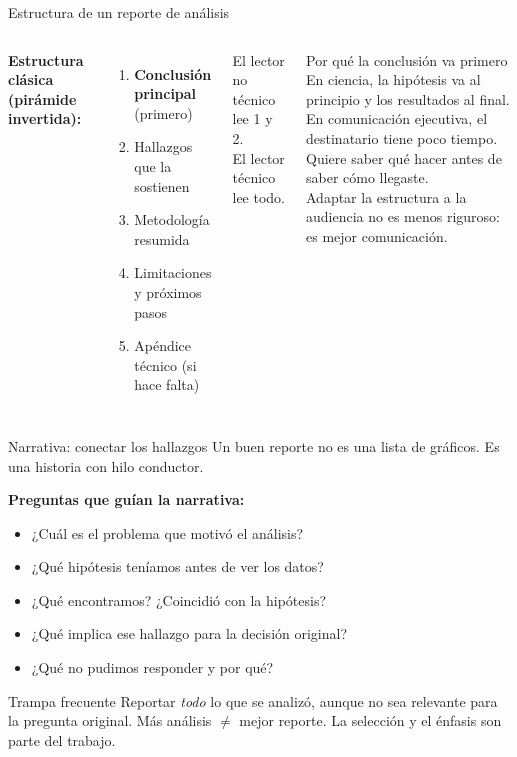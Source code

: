 \documentclass[aspectratio=169]{beamer}
\begin{document}
\begin{frame}{Estructura de un reporte de análisis}
  \begin{columns}
      \textbf{Estructura clásica (pirámide invertida):}
      \begin{enumerate}
        \item \textbf{Conclusión principal} (primero)
        \item Hallazgos que la sostienen
        \item Metodología resumida
        \item Limitaciones y próximos pasos
        \item Apéndice técnico (si hace falta)
      \end{enumerate}
      \bigskip
      El lector no técnico lee 1 y 2.\\
      El lector técnico lee todo.
      \begin{exampleblock}{Por qué la conclusión va primero}
        En ciencia, la hipótesis va al principio y los resultados al final.\\
        En comunicación ejecutiva, el destinatario tiene poco tiempo. Quiere saber qué hacer antes de saber cómo llegaste.\\
        \bigskip
        Adaptar la estructura a la audiencia no es menos riguroso: es mejor comunicación.
      \end{exampleblock}
  \end{columns}
\end{frame}

\begin{frame}{Narrativa: conectar los hallazgos}
  Un buen reporte no es una lista de gráficos. Es una historia con hilo conductor.

  \bigskip
  \textbf{Preguntas que guían la narrativa:}
  \begin{itemize}
    \item ¿Cuál es el problema que motivó el análisis?
    \item ¿Qué hipótesis teníamos antes de ver los datos?
    \item ¿Qué encontramos? ¿Coincidió con la hipótesis?
    \item ¿Qué implica ese hallazgo para la decisión original?
    \item ¿Qué no pudimos responder y por qué?
  \end{itemize}

  \bigskip
  \begin{alertblock}{Trampa frecuente}
    Reportar \textit{todo} lo que se analizó, aunque no sea relevante para la pregunta original. Más análisis $\neq$ mejor reporte. La selección y el énfasis son parte del trabajo.
  \end{alertblock}
\end{frame}
\end{document}
